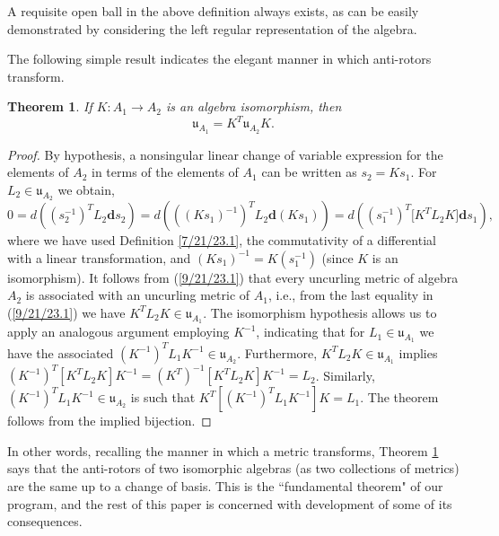 \documentclass{amsart}
\numberwithin{equation}{section}
\newtheorem{theorem}{Theorem}
\theoremstyle{definition}
\numberwithin{theorem}{section}
\begin{document}
   
     A requisite open ball in the above definition always exists, as can be easily demonstrated by considering the left regular representation of the algebra. 

The following simple result indicates the elegant manner in which anti-rotors transform.

\begin{theorem} \label{6/6/23.1} If $K:A_1\rightarrow A_2$ is an algebra isomorphism, then \begin{equation}\label{5/23/23.1} \mathfrak{u}_{A_1} = K^T \mathfrak{u}_{A_2} K. \end{equation} \end{theorem}

\begin{proof} By hypothesis, a nonsingular linear change of variable expression for the elements of $A_2$ in terms of the elements of $A_1$ can be written as $s_2= Ks_1$. \mbox{For $L_2\in \mathfrak{u}_{A_2}$} we obtain, \begin{equation} 0 = d\left((s_2^{-1})^T L_2 \mathbf{d}s_2\right) =  d\left(((Ks_1)^{-1})^T L_2 \mathbf{d}(Ks_1)\right) = d\left((s_1^{-1})^T \big[K^T L_2K\big]\mathbf{d}s_1\right), \label{9/21/23.1}  \end{equation} where we have used Definition \ref{7/21/23.1}, the commutativity of a differential with a linear transformation, and $(Ks_1)^{-1} = K(s_1^{-1})$ (since $K$ is an isomorphism).   It follows from (\ref{9/21/23.1}) that every uncurling metric  of algebra $A_2$ is associated with an uncurling metric of $A_1$, i.e., from the last equality in (\ref{9/21/23.1}) we have  $K^TL_2K\in\mathfrak{u}_{A_1}$.  The isomorphism hypothesis allows us to apply an analogous argument employing $K^{-1}$, indicating that for $L_1\in\mathfrak{u}_{A_1}$ we have the associated $(K^{-1})^T L_1 K^{-1} \in \mathfrak{u}_{A_2}$.    Furthermore, $K^T L_2K\in\mathfrak{u}_{A_1}$ implies $(K^{-1})^T [K^T L_2 K]K^{-1} = (K^T)^{-1} [K^T L_2 K]K^{-1} = L_2$.  Similarly, $(K^{-1})^T L_1K^{-1}\in\mathfrak{u}_{A_2}$ is such that $K^T[(K^{-1})^T L_1K^{-1}] K = L_1$.  The theorem follows from the implied bijection. 
\end{proof}

In other words, recalling the manner in which a metric transforms, Theorem \ref{6/6/23.1} says that the anti-rotors of two isomorphic algebras (as two collections of metrics) are the same up to a change of basis.  This is the ``fundamental theorem" of our program, and the rest of this paper is concerned with development of some of its consequences. 
\end{document}
